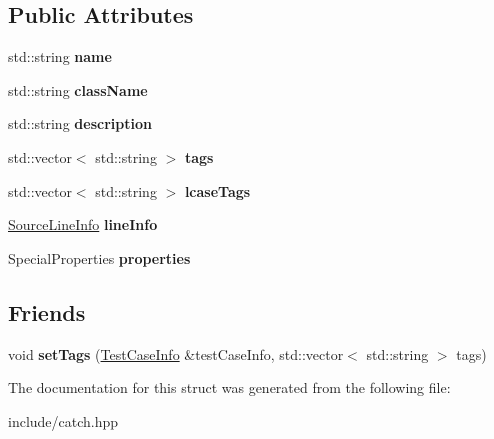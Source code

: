 \subsection*{Public Attributes}
\begin{DoxyCompactItemize}
\item 
std\+::string {\bfseries name}\hypertarget{structCatch_1_1TestCaseInfo_a463794e2f5cfead307c93efd134ade36}{}\label{structCatch_1_1TestCaseInfo_a463794e2f5cfead307c93efd134ade36}

\item 
std\+::string {\bfseries class\+Name}\hypertarget{structCatch_1_1TestCaseInfo_a1a5e0825132a38d091defdebbf2f8ce9}{}\label{structCatch_1_1TestCaseInfo_a1a5e0825132a38d091defdebbf2f8ce9}

\item 
std\+::string {\bfseries description}\hypertarget{structCatch_1_1TestCaseInfo_a37fe2db9425bc45f6a33893eac31198e}{}\label{structCatch_1_1TestCaseInfo_a37fe2db9425bc45f6a33893eac31198e}

\item 
std\+::vector$<$ std\+::string $>$ {\bfseries tags}\hypertarget{structCatch_1_1TestCaseInfo_a150a7cbca1dd0c91799ccb14ff822eb0}{}\label{structCatch_1_1TestCaseInfo_a150a7cbca1dd0c91799ccb14ff822eb0}

\item 
std\+::vector$<$ std\+::string $>$ {\bfseries lcase\+Tags}\hypertarget{structCatch_1_1TestCaseInfo_a844e3de9baf6e53cadfba9733c236bfe}{}\label{structCatch_1_1TestCaseInfo_a844e3de9baf6e53cadfba9733c236bfe}

\item 
\hyperlink{structCatch_1_1SourceLineInfo}{Source\+Line\+Info} {\bfseries line\+Info}\hypertarget{structCatch_1_1TestCaseInfo_aa9407b7f442655b51a2aad24b3fa2fd3}{}\label{structCatch_1_1TestCaseInfo_aa9407b7f442655b51a2aad24b3fa2fd3}

\item 
Special\+Properties {\bfseries properties}\hypertarget{structCatch_1_1TestCaseInfo_afc1e84bd7a2e180895a06d9131302af0}{}\label{structCatch_1_1TestCaseInfo_afc1e84bd7a2e180895a06d9131302af0}

\end{DoxyCompactItemize}
\subsection*{Friends}
\begin{DoxyCompactItemize}
\item 
void {\bfseries set\+Tags} (\hyperlink{structCatch_1_1TestCaseInfo}{Test\+Case\+Info} \&test\+Case\+Info, std\+::vector$<$ std\+::string $>$ tags)\hypertarget{structCatch_1_1TestCaseInfo_a0fe44abaf18ae7c26f98a9fc2b08679c}{}\label{structCatch_1_1TestCaseInfo_a0fe44abaf18ae7c26f98a9fc2b08679c}

\end{DoxyCompactItemize}


The documentation for this struct was generated from the following file\+:\begin{DoxyCompactItemize}
\item 
include/catch.\+hpp\end{DoxyCompactItemize}
